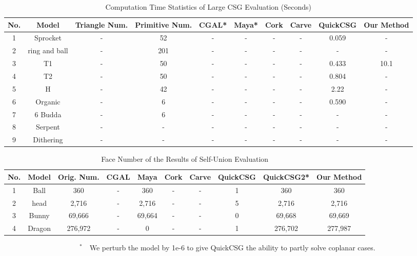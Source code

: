 \documentclass[10pt,journal,compsoc]{IEEEtran}
\begin{document}
\begin{table}[ht]
\caption{Computation Time Statistics of Large CSG Evaluation (Seconds)}
\label{tab:performance2}
\centering
\begin{tabular}{*{9}{c|}c}%
\hline
{No.} & {Model} & {Triangle Num.} & {Primitive Num.} &
CGAL* & Maya* & Cork & Carve & QuickCSG & Our Method
\\
\hline\hline
1 & Sprocket & - & 52 & - & - & - & - & 0.059 & -\\
2 & ring and ball & - & 201 & - & - & - & - & - & -\\
3 & T1 & - & 50 & - & - & - & - & 0.433 & 10.1\\
4 & T2 & - & 50 & - & - & - & - & 0.804 & -\\
5 & H & - & 42 & - & - & - & - & 2.22 & -\\
6 & Organic & - & 6 & - & - & - & - & 0.590 & -\\
7 & 6 Budda & - & 6 & - & - & - & - & - & -\\
8 & Serpent & - & - & - & - & - & - & - & -\\
9 & Dithering & - & - & - & - & - & - & - & -\\
\hline
\end{tabular}
\begin{flushleft}
\end{flushleft}
\end{table}

\begin{table}[ht]
\caption{Face Number of the Results of Self-Union Evaluation}
\label{tab:selfunion}
\centering
\begin{tabular}{*{9}{c|}c}%
\hline
{No.} & {Model} & {Orig. Num.} &
CGAL & Maya & Cork & Carve & QuickCSG & QuickCSG2* & Our Method
\\
\hline\hline
1 & Ball & 360  & - & 360 & - & - & 1 & 360 & 360 \\
2 & head & 2,716& - & 2,716 & - & - & 5 & 2,716 & 2,716\\
3 & Bunny & 69,666  & - & 69,664 & - & -& 0 & 69,668 & 69,669\\
4 & Dragon & 276,972 & - & 0 & - & -& 1 & 276,702 & 277,987 \\
\hline
\end{tabular}
\begin{flushleft}
~~~~~~~~~~~~~~~~~~~~~$^{*}$~~We perturb the model by 1e-6 to give QuickCSG the ability to partly solve coplanar cases.
\end{flushleft}
\end{table}
\end{document}
